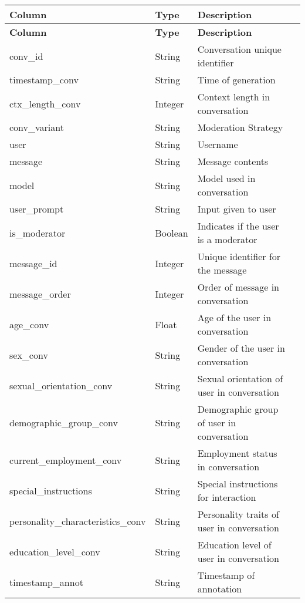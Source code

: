 \renewcommand{\arraystretch}{1.3}
\begin{longtable}{|l|l|l|p{4cm}|}
    \hline
    \rowcolor{gray!30} \textbf{Column} & \textbf{Type} & \textbf{Description} \\
    \hline
    \endfirsthead
    \hline
    \rowcolor{gray!30} \textbf{Column} & \textbf{Type} & \textbf{Description} \\
    \hline
    \endhead
    \hline
    \endfoot
    \hline
    \endlastfoot

    conv\_id & String & Conversation unique identifier \\
    timestamp\_conv & String & Time of generation \\
    ctx\_length\_conv & Integer & Context length in conversation \\
    conv\_variant & String & Moderation Strategy \\
    user & String & Username \\
    message & String & Message contents \\
    model & String & Model used in conversation \\
    user\_prompt & String & Input given to user \\
    is\_moderator & Boolean & Indicates if the user is a moderator \\
    message\_id & Integer & Unique identifier for the message \\
    message\_order & Integer & Order of message in conversation \\
    age\_conv & Float & Age of the user in conversation \\
    sex\_conv & String & Gender of the user in conversation \\
    sexual\_orientation\_conv & String & Sexual orientation of user in conversation \\
    demographic\_group\_conv & String & Demographic group of user in conversation \\
    current\_employment\_conv & String & Employment status in conversation \\
    special\_instructions & String & Special instructions for interaction \\
    personality\_characteristics\_conv & String & Personality traits of user in conversation \\
    education\_level\_conv & String & Education level of user in conversation \\
    timestamp\_annot & String & Timestamp of annotation \\

\end{longtable}
